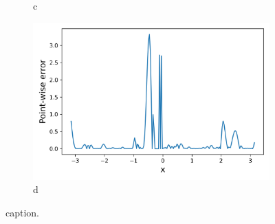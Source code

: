 \begin{figure}[htbp]
\begin{subfigure}{.45\textwidth}
		\caption{c}
	\end{subfigure}
	\begin{subfigure}{.45\textwidth}
		\centering
		\includegraphics[width=1\linewidth]{./figs/snap_rep_err.png}  
		\caption{d}
	\end{subfigure}
	\caption{caption.}
\end{figure}
\blindtext

